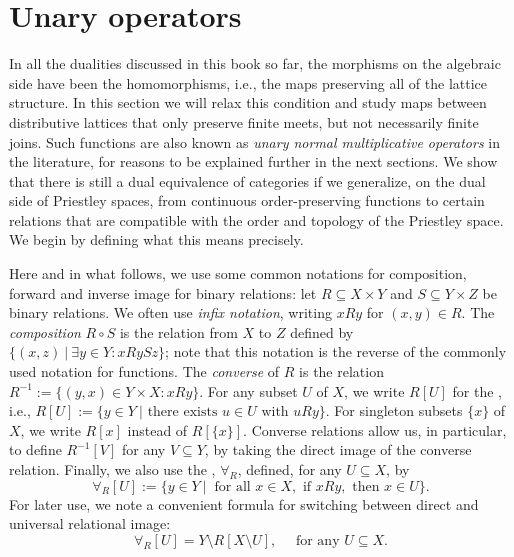 \section{Unary operators}\label{sec:unaryopduality}
In all the dualities discussed in this book so far, the morphisms on the algebraic side have been the homomorphisms, i.e., the maps preserving all of the lattice structure. In this section we will relax this condition and study maps between distributive lattices that only preserve finite meets, but not necessarily finite joins. Such functions are also known as \emph{unary normal multiplicative operators} in the literature, for reasons to be explained further in the next sections. We show that there is still a dual equivalence of categories if we generalize, on the dual side of Priestley spaces, from continuous order-preserving functions to certain relations that are compatible with the order and topology of the Priestley space. We begin by defining what this means precisely.

\begin{notation} \label{relation-notations} Here and in what follows, we use some common notations for composition, forward and inverse image for binary relations: let $R \subseteq X \times Y$ and $S \subseteq Y \times Z$ be binary relations. We often use \emph{infix notation}, writing $x{R}y$ for $(x,y) \in R$. The \emph{composition} $R \circ S$ is the relation from $X$ to $Z$ defined by $\{(x,z) \ | \ \exists y \in Y : x{R}y{S}z\}$; note that this notation is the reverse of the commonly used notation for functions. The \emph{converse} of $R$ is the relation $R^{-1} := \{(y,x) \in Y \times X : xRy\}$. For any subset $U$ of $X$, we write $R[U]$ for the , i.e., $R[U] := \{y \in Y \ | \text{ there exists } u \in U \text{ with } u{R}y \}$. For singleton subsets $\{x\}$ of $X$, we write $R[x]$ instead of $R[\{x\}]$. Converse relations allow us, in particular, to define  $R^{-1}[V]$ for any $V \subseteq Y$, by taking the direct image of the converse relation. Finally, we also use the , $\forall_R$, defined, for any $U \subseteq X$, by
	\begin{equation}\label{eq:relational-univ}
		\forall_R[U] := \{y \in Y \ | \  \text{ for all } x \in X, \text { if } x{R}y, \text{ then } x \in U\}.
	\end{equation}
For later use, we note a convenient formula for switching between direct and universal relational image:
\begin{equation}\label{eq:univ-direct-image}
	\forall_R[U] = Y \setminus R[X \setminus U], \quad \text{ for any } U \subseteq X.
\end{equation}
\end{notation}

